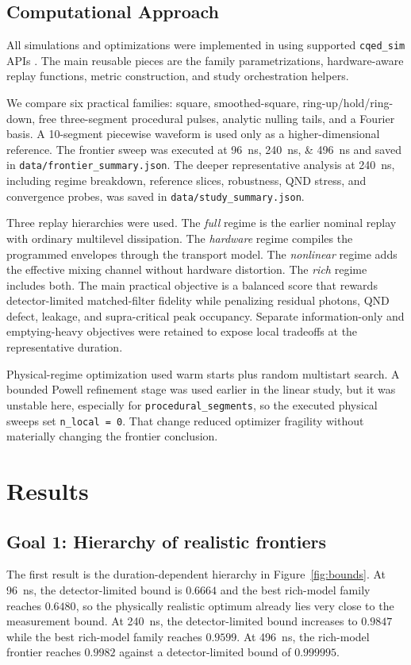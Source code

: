 \documentclass[11pt, a4paper]{article}
\begin{document}
\subsection{Computational Approach}
All simulations and optimizations were implemented in
using supported \texttt{cqed\_sim} APIs \cite{cqedsim}. The main reusable pieces are the
family parametrizations, hardware-aware replay functions, metric construction, and study
orchestration helpers.

We compare six practical families: square, smoothed-square, ring-up/hold/ring-down,
free three-segment procedural pulses, analytic nulling tails, and a Fourier basis. A
10-segment piecewise waveform is used only as a higher-dimensional reference. The frontier
sweep was executed at \SIlist{96;240;496}{ns} and saved in
\texttt{data/frontier\_summary.json}. The deeper representative analysis at
\SI{240}{ns}, including regime breakdown, reference slices, robustness, QND stress, and
convergence probes, was saved in \texttt{data/study\_summary.json}.

Three replay hierarchies were used. The \emph{full} regime is the earlier nominal replay
with ordinary multilevel dissipation. The \emph{hardware} regime compiles the programmed
envelopes through the transport model. The \emph{nonlinear} regime adds the effective
mixing channel without hardware distortion. The \emph{rich} regime includes both. The main
practical objective is a balanced score that rewards detector-limited matched-filter
fidelity while penalizing residual photons, QND defect, leakage, and supra-critical peak
occupancy. Separate information-only and emptying-heavy objectives were retained to expose
local tradeoffs at the representative duration.

Physical-regime optimization used warm starts plus random multistart search. A bounded
Powell refinement stage was used earlier in the linear study, but it was unstable here,
especially for \texttt{procedural\_segments}, so the executed physical sweeps set
\texttt{n\_local = 0}. That change reduced optimizer fragility without materially changing
the frontier conclusion.

\section{Results}

\subsection{Goal 1: Hierarchy of realistic frontiers}
The first result is the duration-dependent hierarchy in Figure~\ref{fig:bounds}. At
\SI{96}{ns}, the detector-limited bound is $0.6664$ and the best rich-model family reaches
$0.6480$, so the physically realistic optimum already lies very close to the measurement
bound. At \SI{240}{ns}, the detector-limited bound increases to $0.9847$ while the best
rich-model family reaches $0.9599$. At \SI{496}{ns}, the rich-model frontier reaches
$0.9982$ against a detector-limited bound of $0.999995$.
\end{document}
